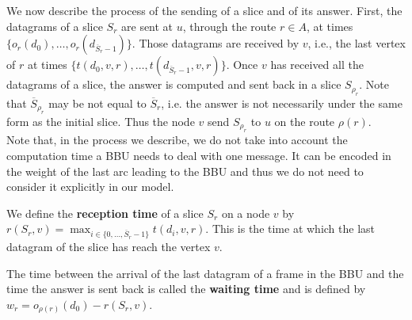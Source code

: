 \documentclass[10pt]{article}
\begin{document}
     
     We now describe the process of the sending of a slice and of its answer. First, the datagrams of a slice $S_r$ are sent at $u$, through the route $r \in A$, at times $\{o_r(d_0),\ldots,o_r(d_{\overline S_r-1}) \}$.
      Those datagrams are received by $v$, i.e., the last vertex of $r$ at times $\{t(d_0,v,r),\ldots,t(d_{\overline S_r-1},v,r)\}$. 
     Once $v$ has received all the datagrams of a slice, the answer is computed and sent back in a slice $S_{\rho_r}$. Note that $\overline S_{\rho_r}$ may be not equal to $\overline S_r$, i.e. the answer is not necessarily under the same form as the initial slice. Thus the node $v$ send $S_{\rho_r}$ to  $u$ on the route $\rho(r)$.\\
     Note that, in the process we describe, we do not take into account the computation time a BBU needs to deal with one message. It can be encoded in the weight of the last arc leading to the BBU and thus we do not need to consider it explicitly in our model. 
      
      
 
      We define the {\bf reception time} of a slice $S_r$ on a node $v$ by $r(S_r,v) =  \displaystyle \max_{i \in \{0,\ldots,\overline S_r-1\}} t(d_i,v,r)$. This is the time at which the last datagram of the slice has reach the vertex $v$.
      
      The time between the arrival of the last datagram of a frame in the BBU and the time the answer is sent back is called the \textbf{waiting time} and is defined by $w_r = o_{\rho(r)}(d_0) - r(S_r,v)$.
      
 
%      
      
\end{document}
